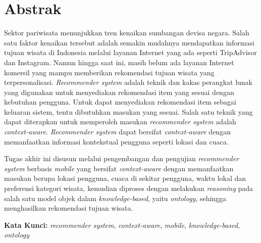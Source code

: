 \chapter*{Abstrak}

Sektor pariwisata menunjukkan tren kenaikan sumbangan devisa negara. Salah satu faktor kenaikan tersebut adalah semakin mudahnya mendapatkan informasi tujuan wisata di Indonesia melalui layanan Internet yang ada seperti TripAdvisor dan Instagram. Namun hingga saat ini, masih belum ada layanan Internet komersil yang mampu memberikan rekomendasi tujuan wisata yang terpersonalisasi. \textit{Recommender system} adalah teknik dan kakas perangkat lunak yang digunakan untuk menyediakan rekomendasi item yang sesuai dengan kebutuhan pengguna. Untuk dapat menyediakan rekomendasi item sebagai keluaran sistem, tentu dibutuhkan masukan yang sesuai. Salah satu teknik yang dapat diterapkan untuk memperoleh masukan \textit{recommender system} adalah \textit{context-aware}. \textit{Recommender system} dapat bersifat \textit{context-aware} dengan memanfaatkan informasi kontekstual pengguna seperti lokasi dan cuaca.

Tugas akhir ini disusun melalui pengembangan dan pengujian \textit{recommender system} berbasis \textit{mobile} yang bersifat \textit{context-aware} dengan memanfaatkan masukan berupa lokasi pengguna, cuaca di sekitar pengguna, waktu lokal dan preferensi kategori wisata, kemudian diproses dengan melakukan \textit{reasoning} pada salah satu model objek dalam \textit{knowledge-based}, yaitu \textit{ontology}, sehingga menghasilkan rekomendasi tujuan wisata.

\vspace{0.5 cm}
\begin{flushleft}
{\textbf{Kata Kunci:} \textit{recommender system}, \textit{context-aware}, \textit{mobile}, \textit{knowledge-based}, \textit{ontology}}
\end{flushleft}